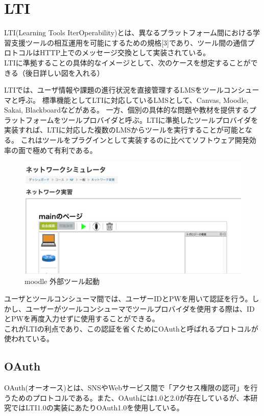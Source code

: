 \section{LTI}\label{tag:LTI}
LTI(Learning Tools IterOperability)とは、異なるプラットフォーム間における学習支援ツールの相互運用を可能にするための規格[3]であり、ツール間の通信プロトコルはHTTP上でのメッセージ交換として実装されている。\\
LTIに準拠することの具体的なイメージとして、次のケースを想定することができる（後日詳しい図を入れる）

LTIでは、ユーザ情報や課題の進行状況を直接管理するLMSをツールコンシューマと呼ぶ。
標準機能としてLTIに対応しているLMSとして、Canvas, Moodle, Sakai, Blackboardなどがある。
一方、個別の具体的な問題や教材を提供するプラットフォームをツールプロバイダと呼ぶ。LTIに準拠したツールプロバイダを実装すれば、LTIに対応した複数のLMSからツールを実行することが可能となる。
これはツールをプラグインとして実装するのに比べてソフトウェア開発効率の面で極めて有利である。

\begin{figure}[htbp]
  \begin{center}
    \includegraphics[scale=0.3]{img/LTIstart.png}
    \caption{moodle 外部ツール起動}
    \label{fig:moodle kidou}
  \end{center}
\end{figure}
ユーザとツールコンシューマ間では、ユーザーIDとPWを用いて認証を行う。しかし、ユーザーがツールコンシューマでツールプロバイダを使用する際は、IDとPWを再度入力せずに使用することができる。\\
これがLTIの利点であり、この認証を省くためにOAuthと呼ばれるプロトコルが使われている。
\subsection{OAuth}
OAuth(オーオース)とは、SNSやWebサービス間で「アクセス権限の認可」を行うためのプロトコルである。また、OAuthには1.0と2.0が存在しているが、本研究ではLTI1.0の実装にあたりOAuth1.0を使用している。
